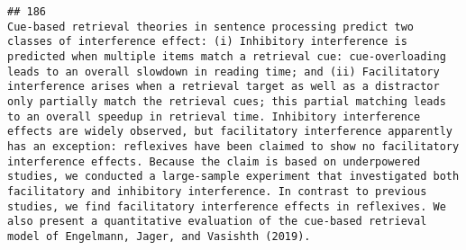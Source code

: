 \documentclass[
  english,
  man]{apa6}
\begin{document}
\begin{verbatim}
## 186                                                                                                                                                                                                                                                                                                                                                                                                                                                                                                                                                                                                                                                                                                                                                                                                                                                                                                                                                                                                                                                                                                                                                                                                                                                                                                                                                                                                                                                                                                                                                                                                                                          Cue-based retrieval theories in sentence processing predict two classes of interference effect: (i) Inhibitory interference is predicted when multiple items match a retrieval cue: cue-overloading leads to an overall slowdown in reading time; and (ii) Facilitatory interference arises when a retrieval target as well as a distractor only partially match the retrieval cues; this partial matching leads to an overall speedup in retrieval time. Inhibitory interference effects are widely observed, but facilitatory interference apparently has an exception: reflexives have been claimed to show no facilitatory interference effects. Because the claim is based on underpowered studies, we conducted a large-sample experiment that investigated both facilitatory and inhibitory interference. In contrast to previous studies, we find facilitatory interference effects in reflexives. We also present a quantitative evaluation of the cue-based retrieval model of Engelmann, Jager, and Vasishth (2019).

\end{verbatim}
\end{document}
